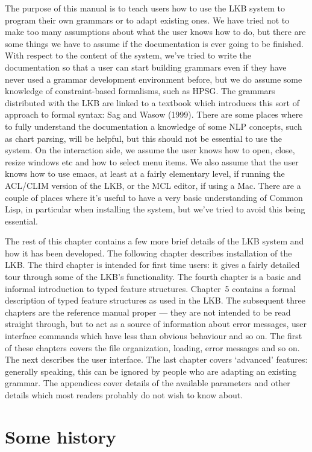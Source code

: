\documentclass[12pt]{report}
\begin{document}
The purpose of this manual is to teach users how to use the LKB system
to program their own grammars or to adapt existing ones.
We have tried not to make too many assumptions
about what the user knows how to do, but there are some things we have 
to assume if the documentation is ever going to be finished.
With respect to the content of the system, we've tried to write the 
documentation so that a user can start building grammars even if
they have never used a grammar development environment before,
but we do assume some knowledge of constraint-based formalisms,
such as HPSG.  The grammars distributed with the LKB are
linked to a textbook which introduces this sort of approach
to formal syntax: Sag and Wasow (1999).
There are some places where to fully understand
the documentation a knowledge of some NLP concepts, such as chart parsing,
will be helpful, but this should not be essential to use the system.
On the interaction side,
we assume the user knows how to open, close, resize windows etc
and how to select menu items.  We also assume that the user knows
how to use emacs, at least at a fairly elementary level, if running
the ACL/CLIM version of the LKB, or the MCL editor, if using a Mac.
There are a couple of places where it's useful to have a 
very basic understanding of Common Lisp, in particular when installing the
system, but we've tried to avoid this being essential.
 
The rest of this chapter contains a few more brief details
of the LKB system and how it has been developed.
The following chapter describes installation of the LKB.
The third chapter
is intended for first time users: it gives
a fairly detailed tour through some of the LKB's functionality.
The fourth chapter is a basic
and informal introduction to typed feature structures.
Chapter~5 contains a formal description
of typed feature structures as used in the LKB.
The subsequent three chapters are the reference manual proper --- they
are not intended to be read straight through, but to act as 
a source of information about error messages,
user interface commands which have less than
obvious behaviour and so on.
The first of these chapters
covers the
file organization, loading, error messages and so on.  The
next describes the user interface.  The last chapter
covers `advanced' features: generally speaking, this can be
ignored by people who are adapting an existing grammar.
The appendices cover details of the
available parameters and other details which most readers probably
do not wish to know about.

\section{Some history}
\end{document}
